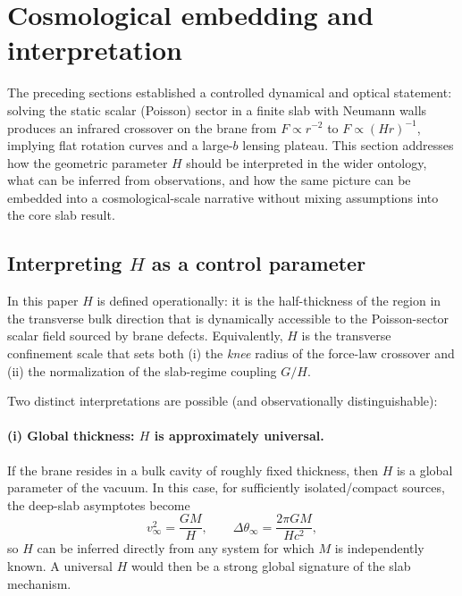 \documentclass[11pt]{article}
\begin{document}
\section{Cosmological embedding and interpretation}
\label{sec:cosmo}

The preceding sections established a controlled dynamical and optical statement:
solving the static scalar (Poisson) sector in a finite slab with Neumann walls produces an infrared
crossover on the brane from $F\propto r^{-2}$ to $F\propto (Hr)^{-1}$, implying flat rotation curves
and a large-$b$ lensing plateau.  This section addresses how the geometric parameter $H$ should be
interpreted in the wider ontology, what can be inferred from observations, and how the same picture
can be embedded into a cosmological-scale narrative without mixing assumptions into the core slab
result.

\subsection{Interpreting $H$ as a control parameter}
\label{sec:cosmo_H}

In this paper $H$ is defined operationally: it is the half-thickness of the region in the transverse
bulk direction that is dynamically accessible to the Poisson-sector scalar field sourced by brane
defects.  Equivalently, $H$ is the transverse confinement scale that sets both
(i) the \emph{knee} radius of the force-law crossover and
(ii) the normalization of the slab-regime coupling $G/H$.

Two distinct interpretations are possible (and observationally distinguishable):

\paragraph{(i) Global thickness: $H$ is approximately universal.}
If the brane resides in a bulk cavity of roughly fixed thickness, then $H$ is a global parameter of
the vacuum.
In this case, for sufficiently isolated/compact sources, the deep-slab asymptotes become
\begin{equation}
  v_\infty^2=\frac{GM}{H},
  \qquad
  \Delta\theta_\infty=\frac{2\pi GM}{Hc^2},
\end{equation}
so $H$ can be inferred directly from any system for which $M$ is independently known.
A universal $H$ would then be a strong global signature of the slab mechanism.
\end{document}
